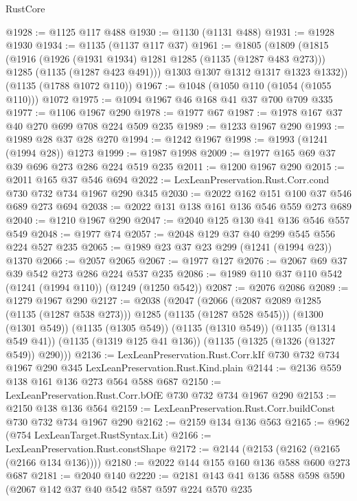 \begin{lexlean}{RustCore}
\begin{coremodule}
@1928 := @1125 @117 @488
@1930 := @1130 (@1131 @488)
@1931 := @1928 @1930
@1934 := @1135 (@1137 @117 @37)
@1961 := @1805
    (@1809
      (@1815
        (@1916
          (@1926 (@1931 @1934) @1281 @1285 (@1135 (@1287 @483 @273)))
          @1285
          (@1135 (@1287 @423 @491)))
        @1303
        @1307
        @1312
        @1317
        @1323
        @1332))
    (@1135 (@1788 @1072 @110))
@1967 := @1048 (@1050 @110 (@1054 (@1055 @110))) @1072
@1975 := @1094 @1967 @46 @168 @41 @37 @700 @709 @335
@1977 := @1106 @1967 @290
@1978 := @1977 @67
@1987 := @1978 @167 @37 @40 @270 @699 @708 @224 @509 @235
@1989 := @1233 @1967 @290
@1993 := @1989 @28 @37 @28 @270
@1994 := @1242 @1967
@1998 := @1993 (@1241 (@1994 @28)) @1273
@1999 := @1987 @1998
@2009 := @1977 @165 @69 @37 @39 @696 @273 @286 @224 @519 @235
@2011 := @1200 @1967 @290
@2015 := @2011 @165 @37 @546 @694
@2022 := LexLeanPreservation.Rust.Corr.cond @730 @732 @734 @1967 @290 @345
@2030 := @2022 @162 @151 @100 @37 @546 @689 @273 @694
@2038 := @2022 @131 @138 @161 @136 @546 @559 @273 @689
@2040 := @1210 @1967 @290
@2047 := @2040 @125 @130 @41 @136 @546 @557 @549
@2048 := @1977 @74
@2057 := @2048 @129 @37 @40 @299 @545 @556 @224 @527 @235
@2065 := @1989 @23 @37 @23 @299 (@1241 (@1994 @23)) @1370
@2066 := @2057 @2065
@2067 := @1977 @127
@2076 := @2067 @69 @37 @39 @542 @273 @286 @224 @537 @235
@2086 := @1989 @110 @37 @110 @542 (@1241 (@1994 @110)) (@1249 (@1250 @542))
@2087 := @2076 @2086
@2089 := @1279 @1967 @290
@2127 := @2038
    (@2047
      (@2066 (@2087 @2089 @1285 (@1135 (@1287 @538 @273))) @1285 (@1135 (@1287 @528 @545)))
      (@1300 (@1301 @549))
      (@1135 (@1305 @549))
      (@1135 (@1310 @549))
      (@1135 (@1314 @549 @41))
      (@1135 (@1319 @125 @41 @136))
      (@1135 (@1325 (@1326 (@1327 @549)) @290)))
@2136 := LexLeanPreservation.Rust.Corr.kIf
    @730
    @732
    @734
    @1967
    @290
    @345
    LexLeanPreservation.Rust.Kind.plain
@2144 := @2136 @559 @138 @161 @136 @273 @564 @588 @687
@2150 := LexLeanPreservation.Rust.Corr.bOfE @730 @732 @734 @1967 @290
@2153 := @2150 @138 @136 @564
@2159 := LexLeanPreservation.Rust.Corr.buildConst @730 @732 @734 @1967 @290
@2162 := @2159 @134 @136 @563
@2165 := @962 (@754 LexLeanTarget.RustSyntax.Lit)
@2166 := LexLeanPreservation.Rust.constShape
@2172 := @2144 (@2153 (@2162 (@2165 (@2166 @134 @136))))
@2180 := @2022 @144 @155 @160 @136 @588 @600 @273 @687
@2181 := @2040 @140
@2220 := @2181
    @143
    @41
    @136
    @588
    @598
    @590
    (@2067
      @142
      @37
      @40
      @542
      @587
      @597
      @224
      @570
      @235

\end{coremodule}
\end{lexlean}
